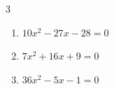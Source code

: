 \begin{multicols}{3}
\begin{enumerate}

  \item $10x^{2}-27x-28=0$


  \item $7x^{2}+16x+9=0$


  \item $36x^{2}-5x-1=0$


\end{enumerate}
\end{multicols}

\newpage
\resetdrill

